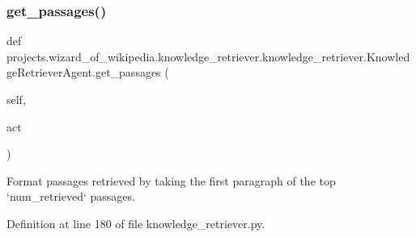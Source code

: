 \subsubsection{\texorpdfstring{get\+\_\+passages()}{get\_passages()}}
{\footnotesize\ttfamily def projects.\+wizard\+\_\+of\+\_\+wikipedia.\+knowledge\+\_\+retriever.\+knowledge\+\_\+retriever.\+Knowledge\+Retriever\+Agent.\+get\+\_\+passages (\begin{DoxyParamCaption}\item[{}]{self,  }\item[{}]{act }\end{DoxyParamCaption})}

\begin{DoxyVerb}Format passages retrieved by taking the first paragraph of the top
`num_retrieved` passages.
\end{DoxyVerb}
 

Definition at line 180 of file knowledge\+\_\+retriever.\+py.


